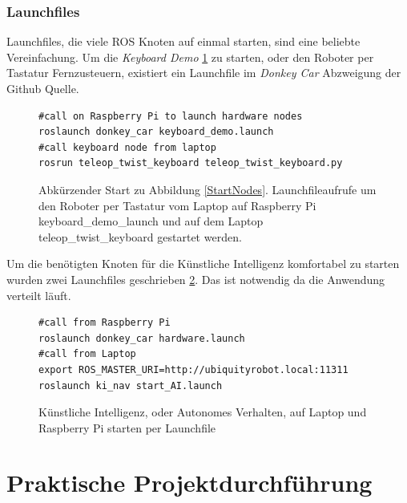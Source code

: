 \documentclass[conference]{IEEEtran}
\begin{document}
	\subsubsection{Launchfiles}
	
	Launchfiles, die viele ROS Knoten auf einmal starten, sind eine beliebte 
	Vereinfachung. Um die \textit{Keyboard Demo} \ref{demo} zu starten, oder 
	den Roboter per Tastatur Fernzusteuern, existiert ein Launchfile im 
	\textit{Donkey Car} 
	Abzweigung der Github Quelle.
	\begin{figure}
		\centering
\begin{verbatim}
#call on Raspberry Pi to launch hardware nodes
roslaunch donkey_car keyboard_demo.launch
#call keyboard node from laptop 
rosrun teleop_twist_keyboard teleop_twist_keyboard.py
\end{verbatim}
\label{demo}
\caption{Abkürzender Start zu Abbildung \ref{StartNodes}. Launchfileaufrufe um den Roboter per Tastatur vom Laptop auf 
 Raspberry Pi keyboard\_demo\_launch und auf dem Laptop 
 teleop\_twist\_keyboard gestartet werden.}

	\end{figure}
	
	Um die benötigten Knoten für die Künstliche Intelligenz komfortabel zu 
	starten wurden zwei Launchfiles geschrieben \ref{KI-launch}. Das ist 
	notwendig da die Anwendung verteilt läuft.
	
	\begin{figure}[h]
		\centering
\begin{verbatim}
#call from Raspberry Pi
roslaunch donkey_car hardware.launch
#call from Laptop
export ROS_MASTER_URI=http://ubiquityrobot.local:11311
roslaunch ki_nav start_AI.launch
		\end{verbatim}
		\label{KI-launch}
		\caption{Künstliche Intelligenz, oder Autonomes Verhalten, auf Laptop 
		und Raspberry Pi starten per Launchfile }
	\end{figure}
	
	\section{Praktische Projektdurchführung}
	
	
\end{document}
